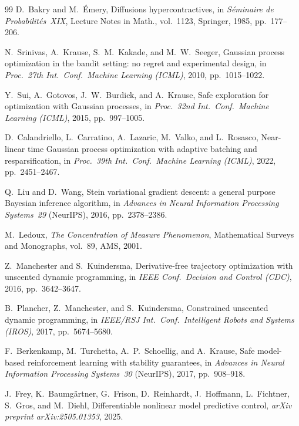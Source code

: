 \begin{thebibliography}{99}
D.~Bakry and M.~\'Emery,
Diffusions hypercontractives,
in \emph{S\'eminaire de Probabilit\'es~XIX},
Lecture Notes in Math., vol.~1123, Springer, 1985, pp.~177--206.

N.~Srinivas, A.~Krause, S.~M.~Kakade, and M.~W.~Seeger,
Gaussian process optimization in the bandit setting: no regret and
experimental design,
in \emph{Proc.\ 27th Int.\ Conf.\ Machine Learning (ICML)}, 2010,
pp.~1015--1022.

Y.~Sui, A.~Gotovos, J.~W.~Burdick, and A.~Krause,
Safe exploration for optimization with Gaussian processes,
in \emph{Proc.\ 32nd Int.\ Conf.\ Machine Learning (ICML)}, 2015,
pp.~997--1005.

D.~Calandriello, L.~Carratino, A.~Lazaric, M.~Valko, and L.~Rosasco,
Near-linear time Gaussian process optimization with adaptive batching
and resparsification,
in \emph{Proc.\ 39th Int.\ Conf.\ Machine Learning (ICML)}, 2022,
pp.~2451--2467.

Q.~Liu and D.~Wang,
Stein variational gradient descent: a general purpose Bayesian inference
algorithm,
in \emph{Advances in Neural Information Processing Systems~29} (NeurIPS),
2016, pp.~2378--2386.

M.~Ledoux,
\emph{The Concentration of Measure Phenomenon},
Mathematical Surveys and Monographs, vol.~89, AMS, 2001.

Z.~Manchester and S.~Kuindersma,
Derivative-free trajectory optimization with unscented dynamic
programming,
in \emph{IEEE Conf.\ Decision and Control (CDC)}, 2016,
pp.~3642--3647.

B.~Plancher, Z.~Manchester, and S.~Kuindersma,
Constrained unscented dynamic programming,
in \emph{IEEE/RSJ Int.\ Conf.\ Intelligent Robots and Systems (IROS)},
2017, pp.~5674--5680.

F.~Berkenkamp, M.~Turchetta, A.~P.~Schoellig, and A.~Krause,
Safe model-based reinforcement learning with stability guarantees,
in \emph{Advances in Neural Information Processing Systems~30} (NeurIPS),
2017, pp.~908--918.

J.~Frey, K.~Baumg\"artner, G.~Frison, D.~Reinhardt,
J.~Hoffmann, L.~Fichtner, S.~Gros, and M.~Diehl,
Differentiable nonlinear model predictive control,
\emph{arXiv preprint arXiv:2505.01353}, 2025.

\end{thebibliography}
